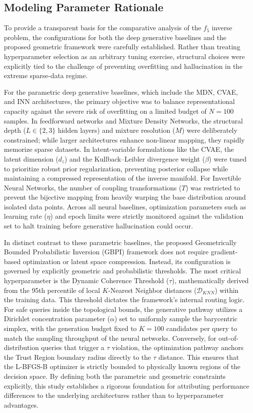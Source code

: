 \subsection{Modeling Parameter Rationale}

To provide a transparent basis for the comparative analysis of the $f_5$ inverse problem, the configurations for both the deep generative baselines and the proposed geometric framework were carefully established. Rather than treating hyperparameter selection as an arbitrary tuning exercise, structural choices were explicitly tied to the challenge of preventing overfitting and hallucination in the extreme sparse-data regime.

For the parametric deep generative baselines, which include the MDN, CVAE, and INN architectures, the primary objective was to balance representational capacity against the severe risk of overfitting on a limited budget of $N=100$ samples. In feedforward networks and Mixture Density Networks, the structural depth ($L \in \{2,3\}$ hidden layers) and mixture resolution ($M$) were deliberately constrained; while larger architectures enhance non-linear mapping, they rapidly memorize sparse datasets. In latent-variable formulations like the CVAE, the latent dimension ($d_z$) and the Kullback--Leibler divergence weight ($\beta$) were tuned to prioritize robust prior regularization, preventing posterior collapse while maintaining a compressed representation of the inverse manifold. For Invertible Neural Networks, the number of coupling transformations ($T$) was restricted to prevent the bijective mapping from heavily warping the base distribution around isolated data points. Across all neural baselines, optimization parameters such as learning rate ($\eta$) and epoch limits were strictly monitored against the validation set to halt training before generative hallucination could occur.

In distinct contrast to these parametric baselines, the proposed Geometrically Bounded Probabilistic Inversion (GBPI) framework does not require gradient-based optimization or latent space compression. Instead, its configuration is governed by explicitly geometric and probabilistic thresholds. The most critical hyperparameter is the Dynamic Coherence Threshold ($\tau$), mathematically derived from the 95th percentile of local $K$-Nearest Neighbor distances ($\mathcal{D}_{KNN}$) within the training data. This threshold dictates the framework's internal routing logic. For safe queries inside the topological bounds, the generative pathway utilizes a Dirichlet concentration parameter ($\alpha$) set to uniformly sample the barycentric simplex, with the generation budget fixed to $K=100$ candidates per query to match the sampling throughput of the neural networks. Conversely, for out-of-distribution queries that trigger a $\tau$ violation, the optimization pathway anchors the Trust Region boundary radius directly to the $\tau$ distance. This ensures that the L-BFGS-B optimizer is strictly bounded to physically known regions of the decision space. By defining both the parametric and geometric constraints explicitly, this study establishes a rigorous foundation for attributing performance differences to the underlying architectures rather than to hyperparameter advantages.



